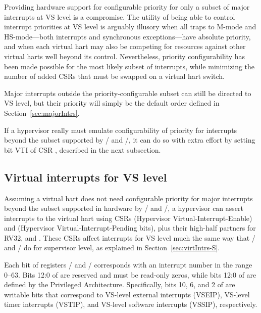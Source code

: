 \begin{commentary}
Providing hardware support for configurable priority for only a subset
of major interrupts at VS level is a compromise.
The utility of being able to control interrupt priorities at
VS level is arguably illusory when all traps to \mbox{M-mode} and
\mbox{HS-mode}---both interrupts and synchronous exceptions---have
absolute priority, and when each virtual hart may also be competing for
resources against other virtual harts well beyond its control.
Nevertheless, priority configurability has been made possible for the
most likely subset of interrupts, while minimizing the number of added
CSRs that must be swapped on a virtual hart switch.

Major interrupts outside the priority-configurable subset can still
be directed to VS level, but their priority will simply be the default
order defined in Section~\ref{sec:majorIntrs}.
\end{commentary}

If a hypervisor really must emulate configurability of priority for
interrupts beyond the subset supported by /
and /, it can do so with extra effort
by setting bit VTI of CSR , described in the next
subsection.

\subsection{Virtual interrupts for VS level}

Assuming a virtual hart does not need configurable priority for
major interrupts beyond the subset supported in hardware by
/ and /, a hypervisor
can assert interrupts to the virtual hart using CSRs 
(Hypervisor Virtual-Interrupt-Enable) and  (Hypervisor
Virtual-Interrupt-Pending bits), plus their high-half partners for RV32,
 and .
These CSRs affect interrupts for VS level much the same way that
/ and / do for supervisor level, as
explained in Section~\ref{sec:virtIntrs-S}.

Each bit of registers / and /
corresponds with an interrupt number in the range 0--63.
Bits 12:0 of  are reserved and must be read-only zeros,
while bits 12:0 of  are defined by the {\RISCV} Privileged
Architecture.
Specifically, bits 10, 6, and 2 of  are writable bits that
correspond to VS-level external interrupts (VSEIP), VS-level timer
interrupts (VSTIP), and VS-level software interrupts (VSSIP),
respectively.


